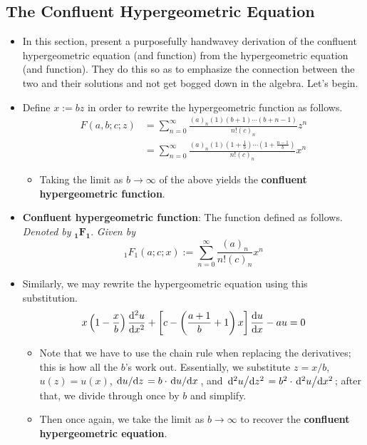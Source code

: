 \documentclass[../finalProject.tex]{subfiles}
\begin{document}
\subsection*{The Confluent Hypergeometric Equation}
\begin{itemize}
    \item In this section, \textcite{bib:Seaborn} present a purposefully handwavey derivation of the confluent hypergeometric equation (and function) from the hypergeometric equation (and function). They do this so as to emphasize the connection between the two and their solutions and not get bogged down in the algebra. Let's begin.
    \item Define $x:=bz$ in order to rewrite the hypergeometric function as follows.
    \begin{align*}
        F(a,b;c;z) &= \sum_{n=0}^\infty\frac{(a)_n(1)(b+1)\cdots(b+n-1)}{n!(c)_n}z^n\\
        &= \sum_{n=0}^\infty\frac{(a)_n(1)(1+\frac{1}{b})\cdots(1+\frac{n-1}{b})}{n!(c)_n}x^n
    \end{align*}
    \begin{itemize}
        \item Taking the limit as $b\to\infty$ of the above yields the \textbf{confluent hypergeometric function}.
    \end{itemize}
    \item \textbf{Confluent hypergeometric function}: The function defined as follows. \emph{Denoted by} $\bm{{}_1F_1}$. \emph{Given by}
    \begin{equation*}
        {}_1F_1(a;c;x) := \sum_{n=0}^\infty\frac{(a)_n}{n!(c)_n}x^n
    \end{equation*}
    \item Similarly, we may rewrite the hypergeometric equation using this substitution.
    \begin{equation*}
        x\left( 1-\frac{x}{b} \right)\dv[2]{u}{x}+\left[ c-\left( \frac{a+1}{b}+1 \right)x \right]\dv{u}{x}-au = 0
    \end{equation*}
    \begin{itemize}
        \item Note that we have to use the chain rule when replacing the derivatives; this is how all the $b$'s work out. Essentially, we substitute $z=x/b$, $u(z)=u(x)$, $\dv*{u}{z}=b\cdot\dv*{u}{x}$, and $\dv*[2]{u}{z}=b^2\cdot\dv*[2]{u}{x}$; after that, we divide through once by $b$ and simplify.
        \item Then once again, we take the limit as $b\to\infty$ to recover the \textbf{confluent hypergeometric equation}.

\end{itemize}
\end{itemize}
\end{document}
